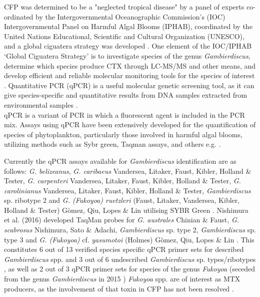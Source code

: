 \documentclass[12pt]{article}
\begin{document}
CFP was determined  to be  a "neglected tropical disease" by a panel of experts co-ordinated by the Intergovernmental Oceanographic Commission’s (IOC) Intergovernmental Panel on Harmful Algal Blooms (IPHAB), coordinated by the United Nations Educational, Scientific and Cultural Organization (UNESCO), and a global ciguatera strategy was developed \cite{globalcig}. 
One element of the IOC/IPHAB ‘Global Ciguatera Strategy’ is to  investigate species of the genus \emph{Gambierdiscus}, determine which species produce CTX through LC-MS/MS and other means, and develop efficient and reliable molecular monitoring tools for the species of interest \citep{globalcig}. Quantitative PCR (qPCR) is a useful molecular genetic screening tool, as it can give species-specific and quantitative results from DNA samples extracted from environmental samples \citep{globalcig}. \\

qPCR is a variant of PCR in which a fluorescent agent is included in the PCR mix. Assays using qPCR have been extensively developed for the quantification of species of phytoplankton, particularly those involved in harmful algal blooms, utilizing methods such as Sybr green, Taqman assays, and others e.g. \citep{murray2011sxta,antonella2013quantitative,smith2009advantages,nishimura2016quantitative,vandersea2012development,hariganeya2013quantitative}. %

Currently the qPCR assays available for \emph{Gambierdiscus} identification are as follows: \emph{G. belizeanus}, \emph{G. caribaeus} Vandersea, Litaker, Faust, Kibler, Holland \& Tester, \emph{G. carpenteri} Vandersea, Litaker, Faust, Kibler, Holland \& Tester, \emph{G. carolinianus} Vandersea, Litaker, Faust, Kibler, Holland \& Tester, \emph{Gambierdiscus} sp. ribotype 2 and \emph{G. (Fukoyoa) ruetzleri} (Faust, Litaker, Vandersea, Kibler, Holland \& Tester) G\`omez, Qiu, Lopes \& Lin utilising SYBR Green \citep{vandersea2012development}. Nishimura et al. (2016) developed TaqMan probes for \emph{G. australes} Chinian \& Faust, \emph{G. scabrosus} Nishimura, Sato \& Adachi, \emph{Gambierdiscus} sp. type 2, \emph{Gambierdiscus} sp. type 3 and \emph{G. (Fukoyoa)} cf. \emph{yasumotoi} (Holmes) G\`omez, Qiu, Lopes \& Lin \citep{nishimura2016quantitative}. This constitutes 6 out of 13 verified species specific qPCR primer sets for described \emph{Gambierdiscus} spp. and 3 out of 6 undescribed \emph{Gambierdiscus} sp. types/ribotypes , as well as 2 out of 3 qPCR primer sets for species of the genus \emph{Fukoyoa} (seceded from the genus \emph{Gambierdiscus} in 2015 \citep{gomez2015fukuyoa}) \textit{Fukoyoa} spp. are of interest as MTX producers, as the involvement of that toxin in CFP has not been resolved \citep{kohli2014feeding}. \\
\end{document}
